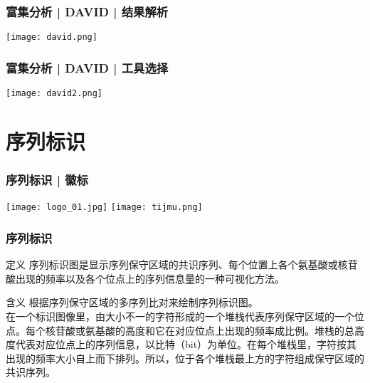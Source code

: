 \begin{frame}
  \frametitle{富集分析 | DAVID | \alert{结果解析}}
  \begin{center}
    \texttt{[image: david.png]}
  \end{center}
\end{frame}

\begin{frame}
  \frametitle{富集分析 | DAVID | 工具选择}
  \begin{center}
    \texttt{[image: david2.png]}
  \end{center}
\end{frame}

\section{序列标识}
\begin{frame}
  \frametitle{序列标识 | 徽标}
  \begin{center}
    \texttt{[image: logo\_01.jpg]}
    \qquad
    \texttt{[image: tijmu.png]}
  \end{center}
\end{frame}

\begin{frame}
  \frametitle{\alert{序列标识}}
  \begin{block}{定义}
序列标识图是显示序列保守区域的共识序列、每个位置上各个氨基酸或核苷酸出现的频率以及各个位点上的序列信息量的一种可视化方法。
  \end{block}
  \pause
  \begin{block}{含义}
    根据序列保守区域的多序列比对来绘制序列标识图。\\
    \vspace{0.5em}
在一个标识图像里，由大小不一的字符形成的一个堆栈代表序列保守区域的一个位点。每个核苷酸或氨基酸的高度和它在对应位点上出现的频率成比例。堆栈的总高度代表对应位点上的序列信息，以比特（bit）为单位。在每个堆栈里，字符按其出现的频率大小自上而下排列。所以，位于各个堆栈最上方的字符组成保守区域的共识序列。
  \end{block}
\end{frame}

